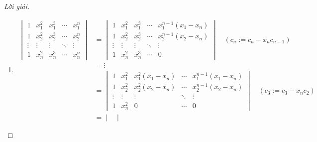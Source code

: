 \documentclass[class=nhvh-linear-algebra,crop=false]{standalone}
\begin{document}
\begin{proof}[Lời giải]
    \begin{enumerate}[label = (\alph*)]
        \item
              \begin{align*}
                  \begin{vmatrix}
                      1      & x_{1}^{2} & x_{1}^{3} & \cdots & x_{1}^{n} \\
                      1      & x_{2}^{2} & x_{2}^{3} & \cdots & x_{2}^{n} \\
                      \vdots & \vdots    & \vdots    & \ddots & \vdots    \\
                      1      & x_{n}^{2} & x_{n}^{3} & \cdots & x_{n}^{n}
                  \end{vmatrix}
                   & =
                  \begin{vmatrix}
                      1      & x_{1}^{2} & x_{1}^{3} & \cdots & x_{1}^{n-1}(x_{1} - x_{n}) \\
                      1      & x_{2}^{2} & x_{2}^{3} & \cdots & x_{2}^{n-1}(x_{2} - x_{n}) \\
                      \vdots & \vdots    & \vdots    & \ddots & \vdots                     \\
                      1      & x_{n}^{2} & x_{n}^{3} & \cdots & 0
                  \end{vmatrix}\quad(c_{n}:= c_{n} - x_{n}c_{n-1})                                     \\
                   & = \vdots                                                                                              \\
                   & =
                  \begin{vmatrix}
                      1      & x_{1}^{2} & x_{1}^{2}(x_{1} - x_{n}) & \cdots & x_{1}^{n-1}(x_{1} - x_{n}) \\
                      1      & x_{2}^{2} & x_{2}^{2}(x_{2} - x_{n}) & \cdots & x_{2}^{n-1}(x_{2} - x_{n}) \\
                      \vdots & \vdots    & \vdots                   & \ddots & \vdots                     \\
                      1      & x_{n}^{2} & 0                        & \cdots & 0
                  \end{vmatrix}\quad(c_{3}:=c_{3} - x_{n}c_{2})                      \\
                   & =
                  \begin{vmatrix}

\end{vmatrix}
\end{align*}
\end{enumerate}
\end{proof}
\end{document}
